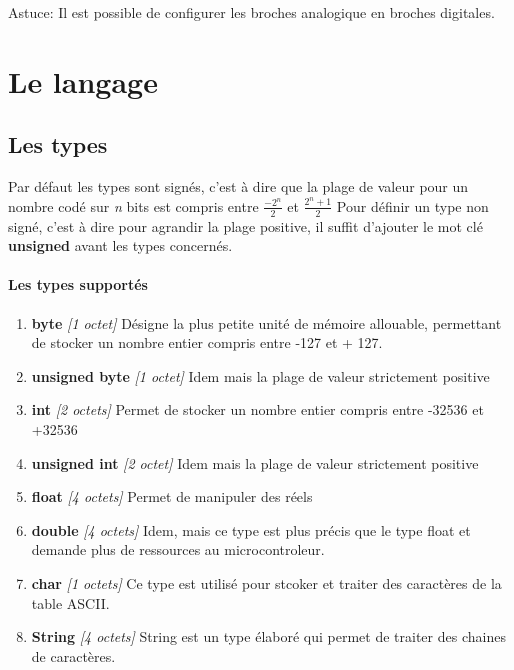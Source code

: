 Astuce: Il est possible de configurer les broches analogique en broches digitales. 


\chapter{Le langage}

\section{Les types}


Par défaut les types sont signés, c'est à dire que la plage de valeur pour un nombre codé sur \emph{n} bits est compris entre $ \frac{-2^n}{2} $ et $ \frac{2^n+1}{2} $ 
Pour définir un type non signé, c'est à dire pour agrandir la plage positive, il suffit d'ajouter le mot clé \textbf{unsigned} avant les types concernés.

\subsubsection {Les types supportés}

\begin{enumerate}
\item \textbf{byte} \textit{[1 octet]} \newline
Désigne la plus petite unité de mémoire allouable, permettant de stocker un nombre entier compris entre -127 et + 127.
\item \textbf{unsigned byte} \textit{[1 octet]} \newline
Idem mais la plage de valeur strictement positive

\item \textbf{int}    \textit{[2 octets]} \newline
Permet de stocker un nombre entier compris entre -32536 et +32536
\item \textbf{unsigned int} \textit{[2 octet]} \newline
Idem mais la plage de valeur strictement positive

\item \textbf{float}  \textit{[4 octets]} \newline
Permet de manipuler des réels
\item \textbf{double} \textit{[4 octets]} \newline
Idem, mais ce type est plus précis que le type float et demande plus de ressources au microcontroleur. 

\item \textbf{char} \textit{[1 octets]} \newline
Ce type est utilisé pour stcoker et traiter des caractères de la table ASCII.\@
\item \textbf{String} \textit{[4 octets]} \newline
String est un type élaboré qui permet de traiter des chaines de caractères.
\end{enumerate}

